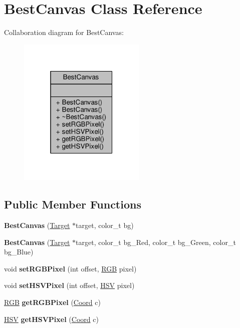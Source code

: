 \hypertarget{classBestCanvas}{}\section{Best\+Canvas Class Reference}
\label{classBestCanvas}


Collaboration diagram for Best\+Canvas\+:
\nopagebreak
\begin{figure}[H]
\begin{center}
\leavevmode
\includegraphics[width=172pt]{classBestCanvas__coll__graph}
\end{center}
\end{figure}
\subsection*{Public Member Functions}
\begin{DoxyCompactItemize}
\item 
\hypertarget{classBestCanvas_ad182d4690d4551842643aebecc7c4855}{}\label{classBestCanvas_ad182d4690d4551842643aebecc7c4855} 
{\bfseries Best\+Canvas} (\hyperlink{classTarget}{Target} $\ast$target, color\+\_\+t bg)
\item 
\hypertarget{classBestCanvas_a8fe1a93900c9c241d180cc4302724458}{}\label{classBestCanvas_a8fe1a93900c9c241d180cc4302724458} 
{\bfseries Best\+Canvas} (\hyperlink{classTarget}{Target} $\ast$target, color\+\_\+t bg\+\_\+\+Red, color\+\_\+t bg\+\_\+\+Green, color\+\_\+t bg\+\_\+\+Blue)
\item 
\hypertarget{classBestCanvas_a132c5ae0ba4a64d861e0f02f4318f4cb}{}\label{classBestCanvas_a132c5ae0ba4a64d861e0f02f4318f4cb} 
void {\bfseries set\+R\+G\+B\+Pixel} (int offset, \hyperlink{structRGB}{R\+GB} pixel)
\item 
\hypertarget{classBestCanvas_a596f525da74cfb4f889ceca87a9cf4f6}{}\label{classBestCanvas_a596f525da74cfb4f889ceca87a9cf4f6} 
void {\bfseries set\+H\+S\+V\+Pixel} (int offset, \hyperlink{structHSV}{H\+SV} pixel)
\item 
\hypertarget{classBestCanvas_abd9c06a1c0304bec04a5060f31f6d9b8}{}\label{classBestCanvas_abd9c06a1c0304bec04a5060f31f6d9b8} 
\hyperlink{structRGB}{R\+GB} {\bfseries get\+R\+G\+B\+Pixel} (\hyperlink{structCoord}{Coord} c)
\item 
\hypertarget{classBestCanvas_ae973df7ff7f90693cca4b883ccde1d59}{}\label{classBestCanvas_ae973df7ff7f90693cca4b883ccde1d59} 
\hyperlink{structHSV}{H\+SV} {\bfseries get\+H\+S\+V\+Pixel} (\hyperlink{structCoord}{Coord} c)
\end{DoxyCompactItemize}


